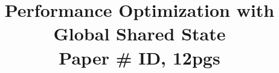 \documentclass{sig-alternate-10pt}
\begin{document}
\title{Performance Optimization with Global Shared State\\
  \normalsize{Paper \# ID, 12pgs}\vspace{-0.5cm}}


\maketitle 





















{\scriptsize


}

\appendix

\end{document}
